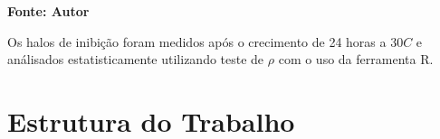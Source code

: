\begin{table}[!htb]
    \caption{Antibióticos utilizados como controle}
    \label{tab:lista_antibioticos}
    \centering
    \begin{small}\textbf{Fonte: Autor}\end{small}
\end{table}


Os halos de inibição foram medidos após o crecimento de 24 horas a $30$\textdegree$C$
e análisados estatisticamente utilizando teste de $\rho$ com
o uso da ferramenta R.

\section{Estrutura do Trabalho}



